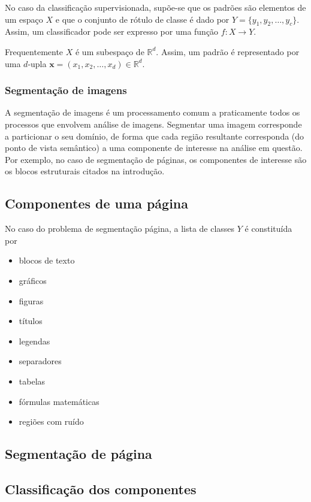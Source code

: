 \documentclass[a4paper,11pt]{article}
\begin{document}
No caso da classificação supervisionada, supõe-se que os padrões são
elementos de um espaço $X$ e que o conjunto de rótulo de classe é dado
por $Y=\{y_1,y_2,\ldots,y_c\}$. Assim, um classificador pode ser
expresso por uma função $f: X \to Y$.

Frequentemente $X$ é um subespaço de $\mathbb{R}^d$. Assim, um padrão
é representado por uma $d$-upla $\mathbf{x}=(x_1,x_2,\ldots,x_d) \in
\mathbb{R}^d$.

\subsubsection{Segmentação de imagens}

A segmentação de imagens é um processamento comum a praticamente
todos os processos que envolvem análise de imagens. Segmentar uma
imagem corresponde a particionar o seu domínio, de forma que cada
região resultante corresponda (do ponto de vista semântico) a uma
componente de interesse na análise em questão. Por exemplo, no caso de
segmentação de páginas, os componentes de interesse são os blocos
estruturais citados na introdução.

\subsection{Componentes de uma página}

No caso do problema de segmentação página, a lista de classes $Y$ é constituída por

\begin{itemize}
  \item blocos de texto
  \item gráficos
  \item figuras
  \item títulos
  \item legendas
  \item separadores
  \item tabelas
  \item fórmulas matemáticas
  \item regiões com ruído
\end{itemize}

\subsection{Segmentação de página}

\subsection{Classificação dos componentes}
\end{document}
